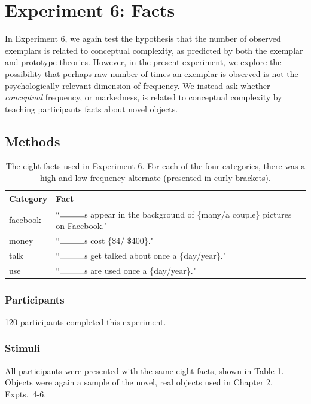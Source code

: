 \section{Experiment 6: Facts}
In Experiment 6, we again test the hypothesis that the number of observed exemplars is related to conceptual complexity, as predicted by both the exemplar and prototype theories. However, in the present experiment, we explore the possibility that perhaps raw number of times an exemplar is observed is not the psychologically relevant dimension of frequency. We instead ask whether {\it conceptual} frequency, or markedness, is related to conceptual complexity by teaching participants facts about novel objects. 

\subsection{Methods}

\begin{table}[t!]
\centering

\begin{tabular}{ll}
\toprule
\textbf{Category} & \textbf{Fact}               \\
\toprule
   facebook & ``$\rule{1cm}{0.15mm}$s appear in the background of \{many/a couple\} pictures on Facebook."\\
   money  &  ``$\rule{1cm}{0.15mm}$s cost \{\$4/ \$400\}."   \\
   talk  & ``$\rule{1cm}{0.15mm}$s get talked about once a \{day/year\}." \\
   use    & ``$\rule{1cm}{0.15mm}$s are used once a \{day/year\}."                             \\

 \bottomrule
\end{tabular}
\caption{The eight facts used in Experiment 6. For each of the four categories, there was a high and low frequency alternate (presented in curly brackets).}
\label{tab:facts}
\end{table}

\subsubsection{Participants} 
120 participants completed this experiment. 

\subsubsection{Stimuli} 
All participants were presented with the same eight facts, shown in Table \ref{tab:facts}. Objects were again a sample of the novel, real objects used in Chapter 2, Expts.\ 4-6. 


